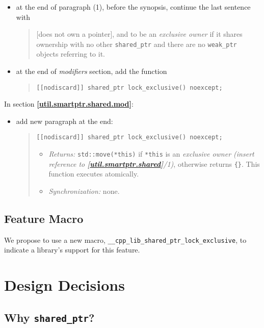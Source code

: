 \documentclass[11pt]{article}
\newcommand{\wgpaper}[1]{\href{https://wg21.link/#1}{#1}}
\newcommand{\isref}[1]{\textbf{[\wgpaper{#1}]}}
\newcommand{\sptr}{\texttt{shared\_ptr}}
\begin{document}
\begin{itemize}
\item at the end of paragraph (1), before the synopsis, continue the last sentence with
  \begin{quotation}
    [does not own a pointer], and to be an \emph{exclusive owner} if
    it shares ownership with no other \sptr{} and there are no
    \texttt{weak\_ptr} objects referring to it.
  \end{quotation}
\item at the end of \textit{modifiers} section, add the function
  \begin{quotation}
    \texttt{[[nodiscard]] shared\_ptr lock\_exclusive() noexcept;}
  \end{quotation}
\end{itemize}

In section \isref{util.smartptr.shared.mod}:

\begin{itemize}
\item add new paragraph at the end:
  \begin{quotation}
    \texttt{[[nodiscard]] shared\_ptr lock\_exclusive() noexcept;}
    \begin{itemize}
    \item\textit{Returns:} \texttt{std::move(*this)} if \texttt{*this}
      is an \textit{exclusive owner (insert reference to
        \isref{util.smartptr.shared}/1)}, otherwise returns
      \texttt{\{\}}. This function executes atomically.
    \item\textit{Synchronization:} none.
    \end{itemize}
  \end{quotation}
\end{itemize}

\subsection{Feature Macro}

We propose to use a new macro,
\texttt{\_\_cpp\_lib\_shared\_ptr\_lock\_exclusive}, to indicate a
library's support for this feature.

\section{Design Decisions}

\subsection{Why \sptr?}
\end{document}
